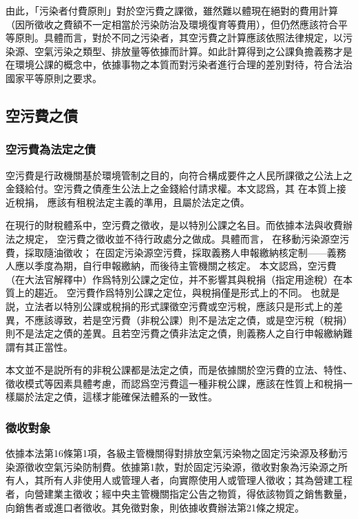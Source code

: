 由此，「污染者付費原則」對於空污費之課徵，雖然難以體現在絕對的費用計算（因所徵收之費額不一定相當於污染防治及環境復育等費用），但仍然應該符合平等原則。具體而言，對於不同之污染者，其空污費之計算應該依照法律規定，以污染源、空氣污染之類型、排放量等依據而計算。如此計算得到之公課負擔義務才是在環境公課的概念中，依據事物之本質而對污染者進行合理的差別對待，符合法治國家平等原則之要求。

\subsection{空污費之債}

\subsubsection{空污費為法定之債}

空污費是行政機關基於環境管制之目的，向符合構成要件之人民所課徵之公法上之金錢給付。空污費之債產生公法上之金錢給付請求權。本文認爲，其
在本質上接近稅捐，
應該有租稅法定主義的準用，且屬於法定之債。


在現行的財稅體系中，空污費之徵收，是以特別公課之名目。而依據本法與收費辦法之規定，
空污費之徵收並不待行政處分之做成。具體而言，
在移動污染源空污費，採取隨油徵收；
在固定污染源空污費，採取義務人申報繳納核定制——義務人應以季度為期，自行申報繳納，而後待主管機關之核定。
本文認爲，空污費（在大法官解釋中）作爲特別公課之定位，并不影響其與稅捐（指定用途稅）在本質上的趨近。
空污費作爲特別公課之定位，與稅捐僅是形式上的不同。
也就是説，立法者以特別公課或稅捐的形式課徵空污費或空污稅，應該只是形式上的差異，不應該導致，若是空污費（非稅公課）則不是法定之債，或是空污稅（稅捐）則不是法定之債的差異。且若空污費之債非法定之債，則義務人之自行申報繳納難謂有其正當性。

本文並不是説所有的非稅公課都是法定之債，而是依據關於空污費的立法、特性、徵收模式等因素具體考慮，而認爲空污費這一種非稅公課，應該在性質上和稅捐一樣屬於法定之債，這樣才能確保法體系的一致性。


\subsubsection{徵收對象}

依據本法第16條第1項，各級主管機關得對排放空氣污染物之固定污染源及移動污染源徵收空氣污染防制費。依據第1款，對於固定污染源，徵收對象為污染源之所有人，其所有人非使用人或管理人者，向實際使用人或管理人徵收；其為營建工程者，向營建業主徵收；經中央主管機關指定公告之物質，得依該物質之銷售數量，向銷售者或進口者徵收。其免徵對象，則依據收費辦法第21條之規定。

